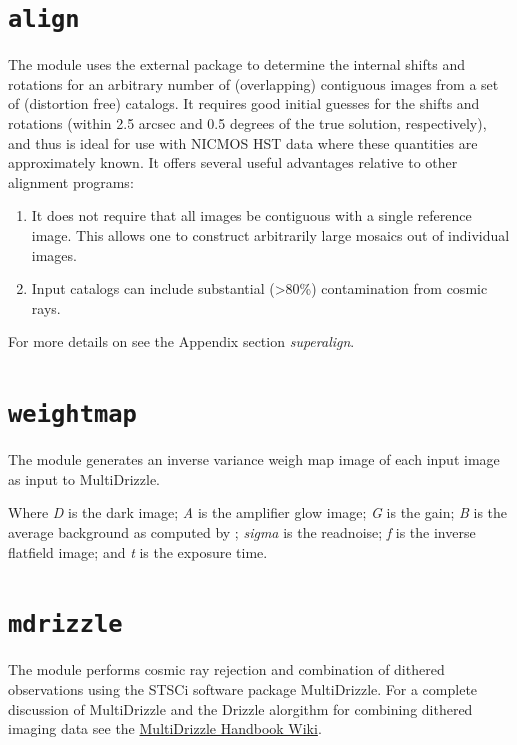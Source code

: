 \documentclass[letterpaper,10pt,english]{sphinxmanual}
\begin{document}
\section{\texttt{align}}
\label{modules:align}
The  module uses the external package  to determine the internal
shifts and rotations for an arbitrary number of (overlapping)
contiguous images from a set of (distortion free) catalogs.  It
requires good initial guesses for the shifts and rotations (within 2.5
arcsec and 0.5 degrees of the true solution, respectively), and thus
is ideal for use with NICMOS HST data where these quantities are
approximately known.  It offers several useful advantages relative to
other alignment programs:
\begin{enumerate}
\item {} 
It does not require that all images be contiguous with a single reference image.
This allows one to construct arbitrarily large mosaics out of individual images.

\item {} 
Input catalogs can include substantial (\textgreater{}80\%) contamination from cosmic rays.

\end{enumerate}

For more details on  see the Appendix section \emph{superalign}.


\section{\texttt{weightmap}}
\label{modules:weightmap}\label{modules:index-8}
The  module generates an inverse variance weigh map image of each input image as input to MultiDrizzle.

Where \emph{D} is the dark image; \emph{A} is the amplifier glow image; \emph{G} is the gain; \emph{B} is the average background as computed by ; \emph{sigma} is the readnoise; \emph{f} is the inverse flatfield image; and \emph{t} is the exposure time.


\section{\texttt{mdrizzle}}
\label{modules:index-9}\label{modules:mdrizzle}
The  module performs cosmic ray rejection and combination of dithered observations using the STSCi software package MultiDrizzle.
For a complete discussion of MultiDrizzle and the Drizzle alorgithm for combining dithered imaging data see the \href{http://incubator.stsci.edu/mediawiki/index.php/Telescopedia:Multidrizzle}{MultiDrizzle Handbook Wiki}.
\end{document}
